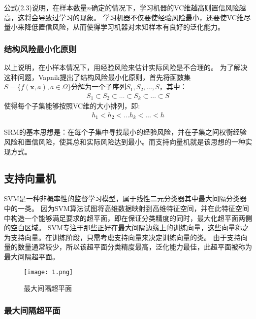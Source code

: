 公式(2.3)说明，在样本数量$n$确定的情况下，学习机器的VC维越高则置信风险越高，这将会导致过学习的现象。
学习机器不仅要使经验风险最小，还要使VC维尽量小来降低置信风险，从而使得学习机器对未知样本有良好的泛化能力。

\subsubsection{结构风险最小化原则}

以上说明，在小样本情况下，用经验风险来估计实际风险是不合理的。
为了解决这种问题，Vapnik提出了结构风险最小化原则，首先将函数集$S=\{f(\mathbf{x},a),a\in\Omega\}$分解为一个子序列$S_1, S_2, \ldots , S$，其中：
\begin{align}
    S_1\subset S_2\subset \ldots \subset S_k\subset \ldots \subset S
\end{align}
使得每个子集能够按照VC维的大小排列，即:
\begin{align}
    h_1 < h_2 < \ldots h_k < \ldots < h
\end{align}

SRM的基本思想是：在每个子集中寻找最小的经验风险，并在子集之间权衡经验风险和置信风险，使其总和实际风险达到最小。而支持向量机就是该思想的一种实现方式。

\subsection{支持向量机}

SVM是一种非概率性的监督学习模型，属于线性二元分类器其中最大间隔分类器中的一类。
因为SVM算法试图将高维数据映射到高维特征空间，并在此特征空间中构造一个能够满足要求的超平面，即在保证分类精度的同时，最大化超平面两侧的空白区域。
SVM专注于那些正好在最大间隔边缘上的训练向量，这些向量称之为支持向量。在训练阶段，只需考虑支持向量来决定训练向量的类。
由于支持向量的数量通常较少，所以该超平面分类精度最高，泛化能力最佳，此超平面被称为最大间隔超平面。

\begin{figure}[ht]
    \centering
    \texttt{[image: 1.png]}
    \caption{最大间隔超平面}
\end{figure}

\subsubsection{最大间隔超平面}

